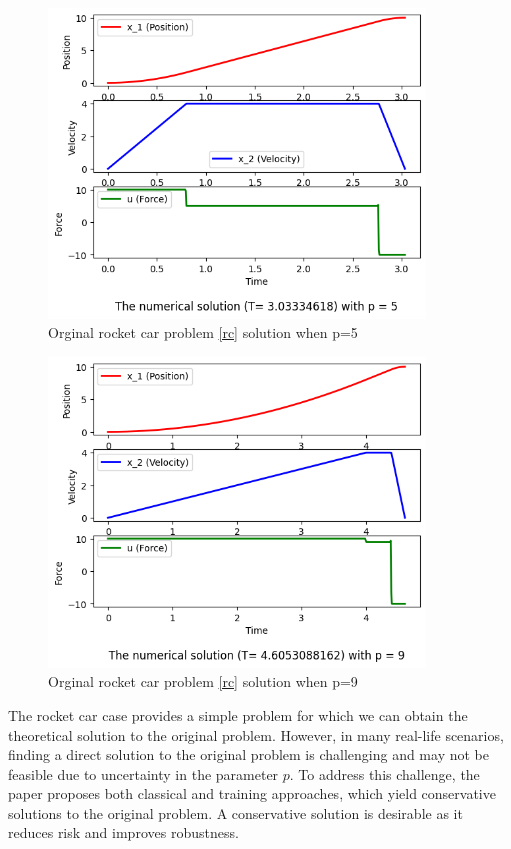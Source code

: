 \documentclass  [
  paper    = a4,
  BCOR     = 10mm,
  twoside,
  fontsize = 12pt,
  fleqn,
  toc      = bibnumbered,
  toc      = listofnumbered,
  numbers  = noendperiod,
  headings = normal,
  listof   = leveldown,
  version  = 3.03
]                                       {scrreprt}
\newcommand{\<}{\langle}
\renewcommand{\>}{\rangle}
\begin{document}
\begin{figure}[H]
	\centerline{\includegraphics[width=10cm]{original_u10_p5.png}}
	\caption{Orginal rocket car problem \ref{rc} solution when p=5}
	\label{fig1_org_u10_p5}
\end{figure}

\begin{figure}[H]
	\centerline{\includegraphics[width=10cm]{original_u10_p9.png}}
	\caption{Orginal rocket car problem \ref{rc} solution when p=9}
	\label{fig1_org_u10_p9}
\end{figure}

The rocket car case provides a simple problem for which we can obtain the theoretical solution to the original problem. However, in many real-life scenarios, finding a direct solution to the original problem is challenging and may not be feasible due to uncertainty in the parameter $p$. To address this challenge, the paper \cite{MatSch22} proposes both classical and training approaches, which yield conservative solutions to the original problem. A conservative solution is desirable as it reduces risk and improves robustness.
\end{document}
